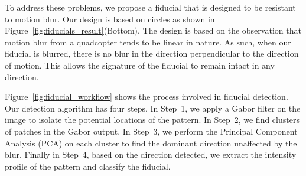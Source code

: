 To address these problems, we propose a fiducial that is designed to be
resistant to motion blur. Our design is based on circles as shown in
Figure~\ref{fig:fiducials_result}(Bottom). The design is based on the
observation that motion blur from a quadcopter tends to be linear in nature. As
such, when our fiducial is blurred, there is no blur in the direction
perpendicular to the direction of motion. This allows the signature of the
fiducial to remain intact in any direction.

Figure~\ref{fig:fiducial_workflow} shows the process involved in fiducial
detection. Our detection algorithm has four steps. In Step~1, we apply a Gabor
filter on the image to isolate the potential locations of the pattern.  In
Step~2, we find clusters of patches in the Gabor output.  In Step~3, we perform
the Principal Component Analysis (PCA) on each cluster to find the dominant
direction unaffected by the blur.  Finally in Step~4, based on the
direction detected, we extract the intensity profile of the pattern
and classify the fiducial.

